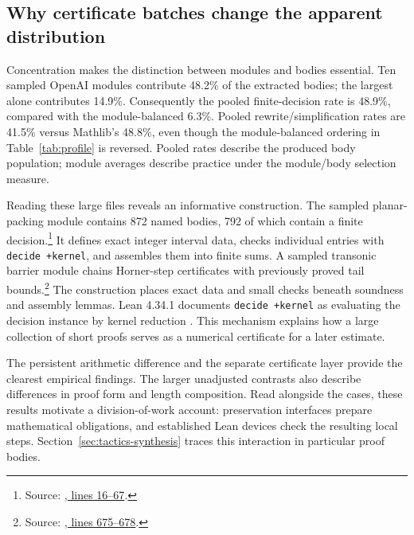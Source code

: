 \subsection{Why certificate batches change the apparent distribution}

Concentration makes the distinction between modules and bodies essential.
Ten sampled OpenAI modules contribute 48.2\% of the extracted bodies;
the largest alone contributes 14.9\%. Consequently the pooled
finite-decision rate is 48.9\%, compared with the module-balanced 6.3\%.
Pooled rewrite/simplification rates are 41.5\% versus Mathlib's 48.8\%,
even though the module-balanced ordering in Table~\ref{tab:profile} is
reversed. Pooled rates describe the produced body population; module
averages describe practice under the module/body selection measure.

Reading these large files reveals an informative construction. The
sampled planar-packing module  contains 872 named
bodies, 792 of which contain a finite decision.\footnote{Source:
\href{https://github.com/openai/math/blob/fd4aeeb2ee4fc729c18d98444fed42fd0529eeeb/lean/OAI/Analysis/PlanarPacking/Certificate/LowBlock36_10.lean\#L16-L67}{, lines 16--67}.}
It defines exact integer interval data, checks individual entries with
\texttt{decide +kernel}, and assembles them into finite sums. A sampled
transonic barrier module chains Horner-step certificates with previously
proved tail bounds.\footnote{Source:
\href{https://github.com/openai/math/blob/fd4aeeb2ee4fc729c18d98444fed42fd0529eeeb/lean/OAI/MathematicalPhysics/Transonic/Certificates/Barrier59.lean\#L675-L678}{, lines 675--678}.}
The construction places exact data and small checks beneath soundness
and assembly lemmas. Lean 4.34.1 documents \texttt{decide +kernel} as
evaluating the decision instance by kernel reduction
\citep{LeanDecideSource}. This mechanism explains how a large collection
of short proofs serves as a numerical certificate for a later estimate.

The persistent arithmetic difference and the separate certificate layer
provide the clearest empirical findings. The larger unadjusted contrasts
also describe differences in proof form and length composition. Read
alongside the cases, these results motivate a division-of-work account:
preservation interfaces prepare mathematical obligations, and established
Lean devices check the resulting local steps. Section~\ref{sec:tactics-synthesis}
traces this interaction in particular proof bodies.
